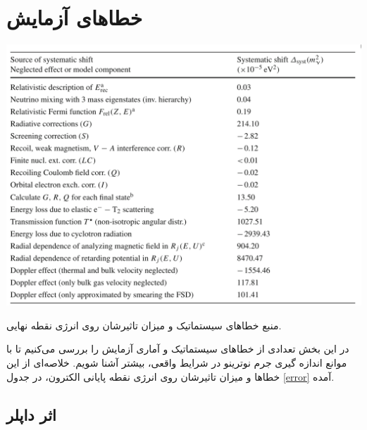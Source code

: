 \documentclass[a4paper,11pt,oneside,openany]{iut-thesis}
\begin{document}
\section{
خطاهای آزمایش
}
\begin{table}
	\includegraphics[width=\linewidth]{table1}
	\caption{
		منبع خطاهای سیستماتیک و میزان تاثیرشان روی انرژی نقطه نهایی.	
	}
	\label{error}
\end{table}


در این بخش تعدادی از خطاهای سیستماتیک و آماری آزمایش را بررسی می‌کنیم تا با موانع اندازه گیری جرم نوترینو در شرایط واقعی، بیشتر آشنا شویم. خلاصه‌ای از این خطاها و میزان تاثیرشان روی انرژی نقطه پایانی الکترون، در جدول 
\ref{error} 
آمده.

\subsection{
اثر داپلر
}
\end{document}
